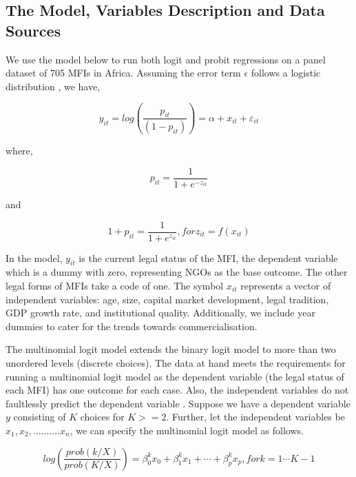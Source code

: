 \documentclass[a4paper, nobind]{templates/ociamthesis}
\begin{document}
\hypertarget{the-model-variables-description-and-data-sources}{%
\subsection{The Model, Variables Description and Data Sources}\label{the-model-variables-description-and-data-sources}}

We use the model below to run both logit and probit regressions on a panel dataset of 705 MFIs in Africa. Assuming the error term \(\epsilon\) follows a logistic distribution \autocite{czepiel2002maximum}, we have,

\begin{equation}
y_{it} = log(\frac{p_{it}}{(1-p_{it})} ) = \alpha + x_{it} + \varepsilon_{it}
\end{equation}

where,

\begin{equation}
p_{it}  =  \frac{1}{1 +  e^{- z_{it} } } 
\end{equation}

and

\begin{equation}
1 + p_{it}  =  \frac{1}{1 +  e^{z_{it} } }, for z_{it} = f(x_{it})
\end{equation}

In the model, \(y_{it}\) is the current legal status of the MFI, the dependent variable which is a dummy with zero, representing NGOs as the base outcome. The other legal forms of MFIs take a code of one. The symbol \(x_{it}\) represents a vector of independent variables: age, size, capital market development, legal tradition, GDP growth rate, and institutional quality. Additionally, we include year dummies to cater for the trends towards commercialisation.

The multinomial logit model extends the binary logit model to more than two unordered levels (discrete choices). The data at hand meets the requirements for running a multinomial logit model as the dependent variable (the legal status of each MFI) has one outcome for each case. Also, the independent variables do not faultlessly predict the dependent variable \autocite{petrucci2009primer}. Suppose we have a dependent variable \(y\) consisting of \(K\) choices for \(K>=2\). Further, let the independent variables be \(x_1, x_2,………. x_n\), we can specify the multinomial logit model as follows.

\begin{equation}
log(\frac{prob(k/X)}{prob(K/X)}) =   \beta_{0}^{k}  x_{0}  + \beta_{1}^{k}  x_{1} +  \cdots + \beta_{p}^{k}  x_{p}, for k = 1 \cdots K-1
\end{equation}
\end{document}
